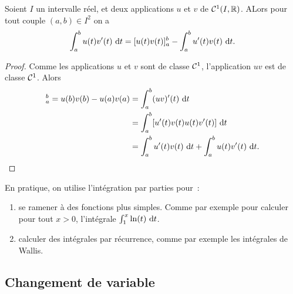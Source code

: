 \begin{theo}
  Soient \(I\) un intervalle réel, et deux applications \(u\) et \(v\) de
  \(\mathcal{C}^{1}(I,\mathbb{R})\). ALors pour tout couple \((a,b) \in I^2\) on a
  \begin{equation}
    \int_a^b u(t)v'(t)\,\mathop{}\mathopen{}\mathrm{d} t = [u(t)v(t)]_a^b - \int_a^b u'(t)v(t)\,\mathop{}\mathopen{}\mathrm{d} t.
  \end{equation}
\end{theo}
\begin{proof}
  Comme les applications \(u\) et \(v\) sont de classe \(\mathcal{C}^{1}\),
  l'application \(uv\) est de classe \(\mathcal{C}^{1}\). Alors
  \begin{align*}
    [u(t)v(t)]_a^b = u(b)v(b)-u(a)v(a) & = \int_a^b (uv)'(t)\,\diff t \\
    & = \int_a^b[u'(t)v(t)u(t)v'(t)]\,\diff t \\
    & = \int_a^b u'(t)v(t)\,\diff t + \int_a^b u(t)v'(t)\,\diff t.
  \end{align*}
\end{proof}

En pratique, on utilise l'intégration par parties pour~:
\begin{enumerate}
  \item se ramener à des fonctions plus simples. Comme par exemple pour calculer
    pour tout \(x>0\), l'intégrale \(\int_1^x \ln(t)\,\mathop{}\mathopen{}\mathrm{d} t\).
  \item calculer des intégrales par récurrence, comme par exemple les intégrales
    de Wallis.
\end{enumerate}

\subsection{Changement de variable}

